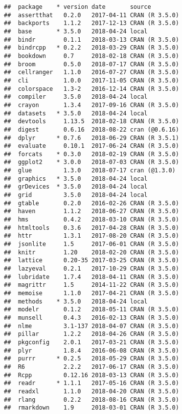 \documentclass[]{book}
\theoremstyle{definition}
\theoremstyle{definition}
\theoremstyle{definition}
\theoremstyle{remark}
\begin{document}
\begin{verbatim}
##  package    * version date       source        
##  assertthat   0.2.0   2017-04-11 CRAN (R 3.5.0)
##  backports    1.1.2   2017-12-13 CRAN (R 3.5.0)
##  base       * 3.5.0   2018-04-24 local         
##  bindr        0.1.1   2018-03-13 CRAN (R 3.5.0)
##  bindrcpp   * 0.2.2   2018-03-29 CRAN (R 3.5.0)
##  bookdown     0.7     2018-02-18 CRAN (R 3.5.0)
##  broom        0.5.0   2018-07-17 CRAN (R 3.5.0)
##  cellranger   1.1.0   2016-07-27 CRAN (R 3.5.0)
##  cli          1.0.0   2017-11-05 CRAN (R 3.5.0)
##  colorspace   1.3-2   2016-12-14 CRAN (R 3.5.0)
##  compiler     3.5.0   2018-04-24 local         
##  crayon       1.3.4   2017-09-16 CRAN (R 3.5.0)
##  datasets   * 3.5.0   2018-04-24 local         
##  devtools     1.13.5  2018-02-18 CRAN (R 3.5.0)
##  digest       0.6.16  2018-08-22 cran (@0.6.16)
##  dplyr      * 0.7.6   2018-06-29 CRAN (R 3.5.1)
##  evaluate     0.10.1  2017-06-24 CRAN (R 3.5.0)
##  forcats    * 0.3.0   2018-02-19 CRAN (R 3.5.0)
##  ggplot2    * 3.0.0   2018-07-03 CRAN (R 3.5.0)
##  glue         1.3.0   2018-07-17 cran (@1.3.0) 
##  graphics   * 3.5.0   2018-04-24 local         
##  grDevices  * 3.5.0   2018-04-24 local         
##  grid         3.5.0   2018-04-24 local         
##  gtable       0.2.0   2016-02-26 CRAN (R 3.5.0)
##  haven        1.1.2   2018-06-27 CRAN (R 3.5.0)
##  hms          0.4.2   2018-03-10 CRAN (R 3.5.0)
##  htmltools    0.3.6   2017-04-28 CRAN (R 3.5.0)
##  httr         1.3.1   2017-08-20 CRAN (R 3.5.0)
##  jsonlite     1.5     2017-06-01 CRAN (R 3.5.0)
##  knitr        1.20    2018-02-20 CRAN (R 3.5.0)
##  lattice      0.20-35 2017-03-25 CRAN (R 3.5.0)
##  lazyeval     0.2.1   2017-10-29 CRAN (R 3.5.0)
##  lubridate    1.7.4   2018-04-11 CRAN (R 3.5.0)
##  magrittr     1.5     2014-11-22 CRAN (R 3.5.0)
##  memoise      1.1.0   2017-04-21 CRAN (R 3.5.0)
##  methods    * 3.5.0   2018-04-24 local         
##  modelr       0.1.2   2018-05-11 CRAN (R 3.5.0)
##  munsell      0.4.3   2016-02-13 CRAN (R 3.5.0)
##  nlme         3.1-137 2018-04-07 CRAN (R 3.5.0)
##  pillar       1.2.2   2018-04-26 CRAN (R 3.5.0)
##  pkgconfig    2.0.1   2017-03-21 CRAN (R 3.5.0)
##  plyr         1.8.4   2016-06-08 CRAN (R 3.5.0)
##  purrr      * 0.2.5   2018-05-29 CRAN (R 3.5.0)
##  R6           2.2.2   2017-06-17 CRAN (R 3.5.0)
##  Rcpp         0.12.16 2018-03-13 CRAN (R 3.5.0)
##  readr      * 1.1.1   2017-05-16 CRAN (R 3.5.0)
##  readxl       1.1.0   2018-04-20 CRAN (R 3.5.0)
##  rlang        0.2.2   2018-08-16 CRAN (R 3.5.0)
##  rmarkdown    1.9     2018-03-01 CRAN (R 3.5.0)

\end{verbatim}
\end{document}
